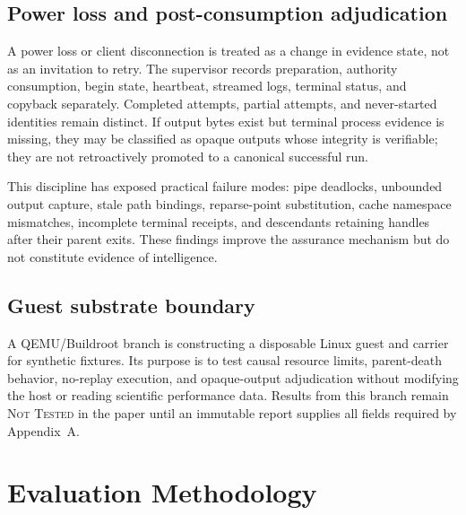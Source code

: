\documentclass[journal,10pt]{IEEEtran}
\newcommand{\NotTested}{\textsc{Not Tested}}
\begin{document}
\subsection{Power loss and post-consumption adjudication}
A power loss or client disconnection is treated as a change in evidence state, not as an invitation to retry. The supervisor records preparation, authority consumption, begin state, heartbeat, streamed logs, terminal status, and copyback separately. Completed attempts, partial attempts, and never-started identities remain distinct. If output bytes exist but terminal process evidence is missing, they may be classified as opaque outputs whose integrity is verifiable; they are not retroactively promoted to a canonical successful run.

This discipline has exposed practical failure modes: pipe deadlocks, unbounded output capture, stale path bindings, reparse-point substitution, cache namespace mismatches, incomplete terminal receipts, and descendants retaining handles after their parent exits. These findings improve the assurance mechanism but do not constitute evidence of intelligence.

\subsection{Guest substrate boundary}
A QEMU/Buildroot branch is constructing a disposable Linux guest and carrier for synthetic fixtures. Its purpose is to test causal resource limits, parent-death behavior, no-replay execution, and opaque-output adjudication without modifying the host or reading scientific performance data. Results from this branch remain \NotTested{} in the paper until an immutable report supplies all fields required by Appendix~A.

\section{Evaluation Methodology}
\end{document}
